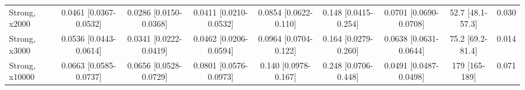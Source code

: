 \begin{tabular}{lcccccccc}
Strong, x2000 & 0.0461 {\scriptsize[0.0367-0.0532]} & 0.0286 {\scriptsize[0.0150-0.0368]} & 0.0411 {\scriptsize[0.0210-0.0532]} & 0.0854 {\scriptsize[0.0622-0.110]} & 0.148 {\scriptsize[0.0415-0.254]} & 0.0701 {\scriptsize[0.0690-0.0708]} & 52.7 {\scriptsize[48.1-57.3]} & 0.030 \\
Strong, x3000 & 0.0536 {\scriptsize[0.0443-0.0614]} & 0.0341 {\scriptsize[0.0222-0.0419]} & 0.0462 {\scriptsize[0.0206-0.0594]} & 0.0964 {\scriptsize[0.0704-0.122]} & 0.164 {\scriptsize[0.0279-0.260]} & 0.0638 {\scriptsize[0.0631-0.0644]} & 75.2 {\scriptsize[69.2-81.4]} & 0.014 \\
Strong, x10000 & 0.0663 {\scriptsize[0.0585-0.0737]} & 0.0656 {\scriptsize[0.0528-0.0729]} & 0.0801 {\scriptsize[0.0576-0.0973]} & 0.140 {\scriptsize[0.0978-0.167]} & 0.248 {\scriptsize[0.0706-0.448]} & 0.0491 {\scriptsize[0.0487-0.0498]} & 179 {\scriptsize[165-189]} & 0.071 \\
\bottomrule
\end{tabular}

